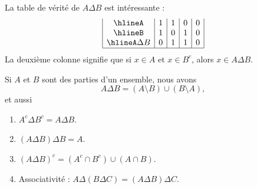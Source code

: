 \begin{remark}\label{REMooTableVeriteDiffSym}
	La table de vérité de \( A\Delta B\) est intéressante :
	\begin{equation}        \label{EQooOJBOooKkKbYp}
		\begin{array}{|c|c|c|c|c|}
			\hline%
			A         & 1 & 1 & 0 & 0 \\
			\hline%
			B         & 1 & 0 & 1 & 0 \\
			\hline%
			A\Delta B & 0 & 1 & 1 & 0 \\
			\hline%
		\end{array}
	\end{equation}
	La deuxième colonne signifie que si \( x\in A\) et \( x\in B^c\), alors \( x\in A\Delta B\).
\end{remark}


\begin{lemma}   \label{LemCUVoohKpWB}
	Si \( A\) et \( B\) sont des parties d'un ensemble, nous avons
	\begin{equation}		\label{EQooMWTNooKXfFvU}
		A\Delta B=(A\setminus B)\cup (B\setminus A),
	\end{equation}
	et aussi
	\begin{enumerate}
		\item       \label{ItemVUCooHAztC}
		      \( A^c\Delta B^c=A\Delta B\).
		      \item\label{ItemVUCooHAztCii}
		      \( (A\Delta B)\Delta B=A\).
		\item       \label{ITEMooSPZXooPTgisP}
		      \( (A\Delta B)^c=(A^c\cap B^c)\cup(A\cap B)\).
		\item       \label{ITEMooSMXWooYcWsRC}
		      Associativité : \( A\Delta (B\Delta C)=(A\Delta B)\Delta C\).
	\end{enumerate}
\end{lemma}

